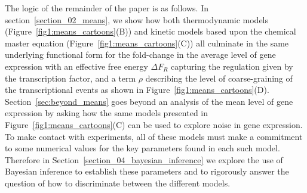 The logic of the remainder of the paper is as follows. In
section~\ref{section_02_means}, we show how both thermodynamic models
(Figure~\ref{fig1:means_cartoons}(B)) and kinetic models based upon the chemical
master equation (Figure~\ref{fig1:means_cartoons}(C)) all culminate in the same
underlying functional form for the fold-change in the average level of gene
expression with an effective free energy $\Delta F_R$ capturing the regulation
given by the transcription factor, and a term $\rho$ describing the level of
coarse-graining of the transcriptional events as shown in
Figure~\ref{fig1:means_cartoons}(D). Section~\ref{sec:beyond_means} goes beyond
an analysis of the mean level of gene expression by asking how the same models
presented in Figure~\ref{fig1:means_cartoons}(C) can be used to explore noise in
gene expression. To make contact with experiments, all of these models must make
a commitment to some numerical values for the key parameters found in each such
model. Therefore in Section~\ref{section_04_bayesian_inference} we explore the
use of Bayesian inference to establish these parameters and to rigorously answer
the question of how to discriminate between the different models.
